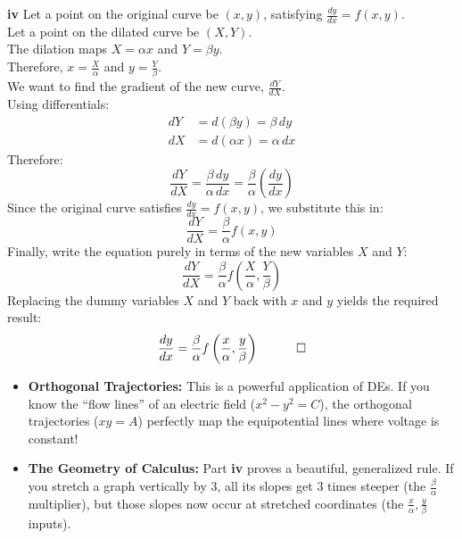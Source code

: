 \begin{solution}
\vspace{0.3cm}
\textbf{iv} Let a point on the original curve be $(x, y)$, satisfying $\frac{dy}{dx} = f(x,y)$. \\
Let a point on the dilated curve be $(X, Y)$. \\
The dilation maps $X = \alpha x$ and $Y = \beta y$. \\
Therefore, $x = \frac{X}{\alpha}$ and $y = \frac{Y}{\beta}$. \\
We want to find the gradient of the new curve, $\frac{dY}{dX}$. \\
Using differentials:
\begin{align*}
    dY &= d(\beta y) = \beta \, dy \\
    dX &= d(\alpha x) = \alpha \, dx
\end{align*}
Therefore:
\[ \frac{dY}{dX} = \frac{\beta \, dy}{\alpha \, dx} = \frac{\beta}{\alpha} \left(\frac{dy}{dx}\right) \]
Since the original curve satisfies $\frac{dy}{dx} = f(x,y)$, we substitute this in:
\[ \frac{dY}{dX} = \frac{\beta}{\alpha} f(x, y) \]
Finally, write the equation purely in terms of the new variables $X$ and $Y$:
\[ \frac{dY}{dX} = \frac{\beta}{\alpha} f\left(\frac{X}{\alpha}, \frac{Y}{\beta}\right) \]
Replacing the dummy variables $X$ and $Y$ back with $x$ and $y$ yields the required result:
\[ \frac{dy}{dx} = \frac{\beta}{\alpha} f\left(\frac{x}{\alpha}, \frac{y}{\beta}\right) \quad \qed \]
\end{solution}

\begin{takeaways}
\begin{itemize}[leftmargin=*]
    \item \textbf{Orthogonal Trajectories:} This is a powerful application of DEs. If you know the ``flow lines'' of an electric field ($x^2-y^2=C$), the orthogonal trajectories ($xy=A$) perfectly map the equipotential lines where voltage is constant!
    \item \textbf{The Geometry of Calculus:} Part \textbf{iv} proves a beautiful, generalized rule. If you stretch a graph vertically by $3$, all its slopes get $3$ times steeper (the $\frac{\beta}{\alpha}$ multiplier), but those slopes now occur at stretched coordinates (the $\frac{x}{\alpha}, \frac{y}{\beta}$ inputs). 
\end{itemize}
\end{takeaways}

